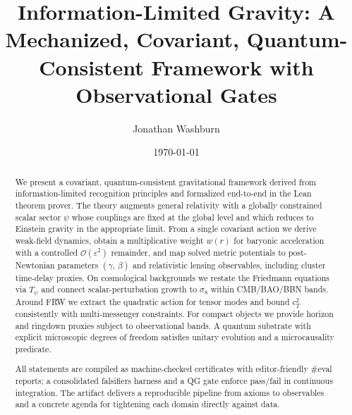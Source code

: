 \documentclass[aps,prd,twocolumn,superscriptaddress,nofootinbib,floatfix,longbibliography]{revtex4-2}
\newcommand{\Order}{\mathcal{O}}
\begin{document}
\title{Information-Limited Gravity: A Mechanized, Covariant, Quantum-Consistent Framework with Observational Gates}

\author{Jonathan Washburn}


\date{\today}

\begin{abstract}
We present a covariant, quantum-consistent gravitational framework derived from information-limited recognition principles and formalized end-to-end in the Lean theorem prover. The theory augments general relativity with a globally constrained scalar sector $\psi$ whose couplings are fixed at the global level and which reduces to Einstein gravity in the appropriate limit. From a single covariant action we derive weak-field dynamics, obtain a multiplicative weight $w(r)$ for baryonic acceleration with a controlled $\Order(\varepsilon^2)$ remainder, and map solved metric potentials to post-Newtonian parameters $(\gamma,\,\beta)$ and relativistic lensing observables, including cluster time-delay proxies. On cosmological backgrounds we restate the Friedmann equations via $T_\psi$ and connect scalar-perturbation growth to $\sigma_8$ within CMB/BAO/BBN bands. Around FRW we extract the quadratic action for tensor modes and bound $c_T^2$ consistently with multi-messenger constraints. For compact objects we provide horizon and ringdown proxies subject to observational bands. A quantum substrate with explicit microscopic degrees of freedom satisfies unitary evolution and a microcausality predicate.

All statements are compiled as machine-checked certificates with editor-friendly \#eval reports; a consolidated falsifiers harness and a QG gate enforce pass/fail in continuous integration. The artifact delivers a reproducible pipeline from axioms to observables and a concrete agenda for tightening each domain directly against data.
\end{abstract}

\maketitle


% 
% 
% 
% 
% 
% 
% 
% 
% 
% 
% 
% 
\end{document}
